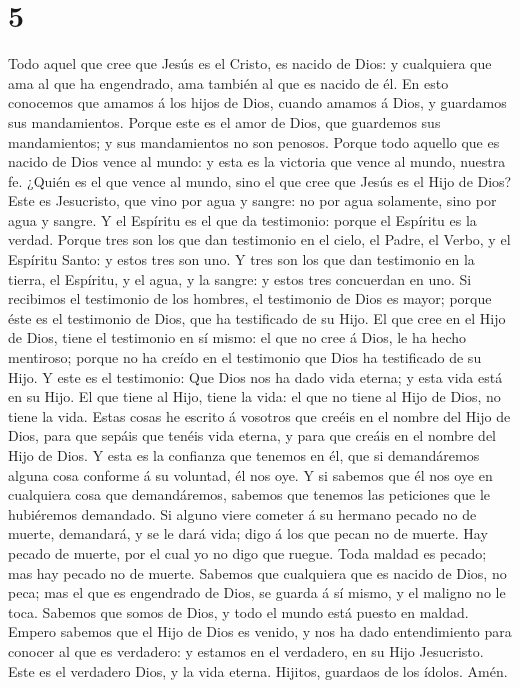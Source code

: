 \hypertarget{section-4}{%
\section{5}\label{section-4}}

 Todo aquel que cree que Jesús es el Cristo, es nacido de
Dios: y cualquiera que ama al que ha engendrado, ama también al que es
nacido de él.  En esto conocemos que amamos á los hijos de
Dios, cuando amamos á Dios, y guardamos sus mandamientos. 
Porque este es el amor de Dios, que guardemos sus mandamientos; y sus
mandamientos no son penosos.  Porque todo aquello que es
nacido de Dios vence al mundo: y esta es la victoria que vence al mundo,
nuestra fe.  ¿Quién es el que vence al mundo, sino el que
cree que Jesús es el Hijo de Dios?  Este es Jesucristo, que
vino por agua y sangre: no por agua solamente, sino por agua y sangre. Y
el Espíritu es el que da testimonio: porque el Espíritu es la verdad.
 Porque tres son los que dan testimonio en el cielo, el
Padre, el Verbo, y el Espíritu Santo: y estos tres son uno. 
Y tres son los que dan testimonio en la tierra, el Espíritu, y el agua,
y la sangre: y estos tres concuerdan en uno.  Si recibimos
el testimonio de los hombres, el testimonio de Dios es mayor; porque
éste es el testimonio de Dios, que ha testificado de su Hijo.
 El que cree en el Hijo de Dios, tiene el testimonio en sí
mismo: el que no cree á Dios, le ha hecho mentiroso; porque no ha creído
en el testimonio que Dios ha testificado de su Hijo.  Y
este es el testimonio: Que Dios nos ha dado vida eterna; y esta vida
está en su Hijo.  El que tiene al Hijo, tiene la vida: el
que no tiene al Hijo de Dios, no tiene la vida.  Estas
cosas he escrito á vosotros que creéis en el nombre del Hijo de Dios,
para que sepáis que tenéis vida eterna, y para que creáis en el nombre
del Hijo de Dios.  Y esta es la confianza que tenemos en
él, que si demandáremos alguna cosa conforme á su voluntad, él nos oye.
 Y si sabemos que él nos oye en cualquiera cosa que
demandáremos, sabemos que tenemos las peticiones que le hubiéremos
demandado.  Si alguno viere cometer á su hermano pecado no
de muerte, demandará, y se le dará vida; digo á los que pecan no de
muerte. Hay pecado de muerte, por el cual yo no digo que ruegue.
 Toda maldad es pecado; mas hay pecado no de muerte.
 Sabemos que cualquiera que es nacido de Dios, no peca; mas
el que es engendrado de Dios, se guarda á sí mismo, y el maligno no le
toca.  Sabemos que somos de Dios, y todo el mundo está
puesto en maldad.  Empero sabemos que el Hijo de Dios es
venido, y nos ha dado entendimiento para conocer al que es verdadero: y
estamos en el verdadero, en su Hijo Jesucristo. Este es el verdadero
Dios, y la vida eterna.  Hijitos, guardaos de los ídolos.
Amén.

